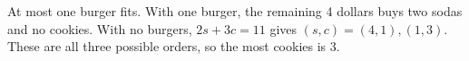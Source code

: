 At most one burger fits. With one burger, the remaining 4 dollars buys two sodas and no cookies. With no burgers, $2s+3c=11$ gives $(s,c)=(4,1),(1,3)$. These are all three possible orders, so the most cookies is $\boxed3$.

